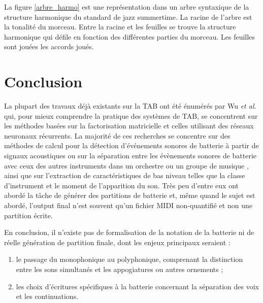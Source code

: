La figure \ref{arbre_harmo} est une représentation dans un arbre syntaxique de
la structure harmonique du standard de jazz summertime. La racine de l’arbre
est la tonalité du morceau. Entre la racine et les feuilles se trouve la
structure harmonique qui défile en fonction des différentes parties du morceau.
Les feuilles sont jouées les accords joués.

\section*{Conclusion}
La plupart des travaux déjà existants sur la TAB ont été énumérés par Wu
\textit{et al.} \cite{Review_ADT} qui, pour mieux comprendre la pratique des
systèmes de TAB, se concentrent sur les méthodes basées sur la factorisation
matricielle et celles utilisant des réseaux neuronaux récurrents. La majorité
de ces recherches se concentre sur des méthodes de calcul pour la détection
d'événements sonores de batterie à partir de signaux acoustiques ou sur la
séparation entre les évènements sonores de batterie avec ceux des autres
instruments dans un orchestre ou un groupe de musique \cite{2802}, ainsi que
sur l'extraction de caractéristiques de bas niveau telles que la classe
d'instrument et le moment de l'apparition du son. Très peu d'entre eux ont
abordé la tâche de générer des partitions de batterie et, même quand le sujet
est abordé, l’output final n’est souvent qu’un fichier MIDI non-quantifié et
non une partition écrite.

En conclusion, il n’existe pas de formalisation de la notation de la batterie
ni de réelle génération de partition finale, dont les enjeux principaux
seraient :
\begin{enumerate}
    \item le passage du monophonique au polyphonique, comprenant la distinction
        entre les sons simultanés et les appogiatures ou autres ornements ;
    \item les choix d’écritures spécifiques à la batterie concernant la
        séparation des voix et les continuations.
\end{enumerate}
